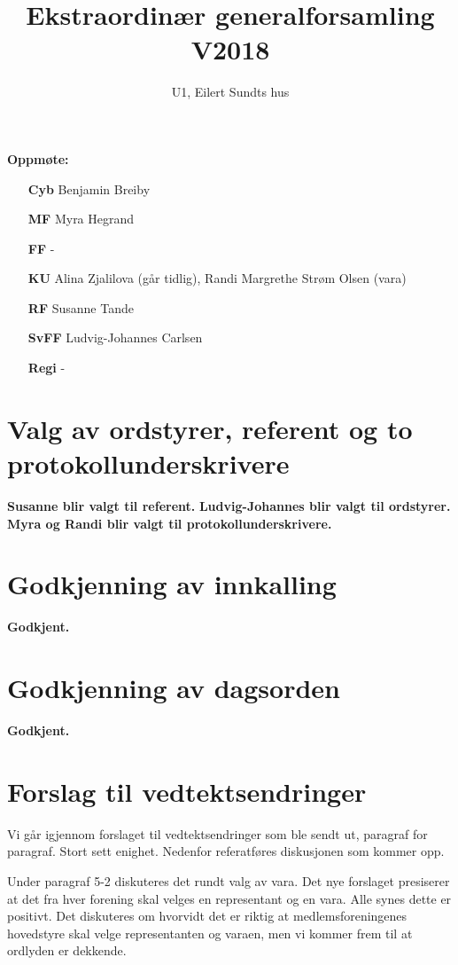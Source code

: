 \documentclass[a4paper,norsk]{article}
\title{Ekstraordinær generalforsamling V2018}
\author{U1, Eilert Sundts hus}
\begin{document}
\maketitle
\textbf{Oppmøte:}
	\begin{itemize}
		\item[\textbf{Cyb}] Benjamin Breiby
		\item[\textbf{MF}] Myra Hegrand
		\item[\textbf{FF}] -
		\item[\textbf{KU}] Alina Zjalilova (går tidlig), Randi Margrethe Strøm Olsen (vara)
		\item[\textbf{RF}] Susanne Tande
		\item[\textbf{SvFF}] Ludvig-Johannes Carlsen
		\item[\textbf{Regi}] - 
	\end{itemize}
\tableofcontents
\newpage


\section{Valg av ordstyrer, referent og to protokollunderskrivere}
\textbf{Susanne blir valgt til referent.}
\textbf{Ludvig-Johannes blir valgt til ordstyrer.}
\textbf{Myra og Randi blir valgt til protokollunderskrivere.}

\section{Godkjenning av innkalling}
\textbf{Godkjent.}

\section{Godkjenning av dagsorden}
\textbf{Godkjent.}

\section{Forslag til vedtektsendringer}
Vi går igjennom forslaget til vedtektsendringer som ble sendt ut, paragraf for paragraf. Stort sett enighet. Nedenfor referatføres diskusjonen som kommer opp.

Under paragraf 5-2 diskuteres det rundt valg av vara. Det nye forslaget presiserer at det fra hver forening skal velges en representant og en vara. Alle synes dette er positivt. Det diskuteres om hvorvidt det er riktig at medlemsforeningenes hovedstyre skal velge representanten og varaen, men vi kommer frem til at ordlyden er dekkende.
\end{document}
